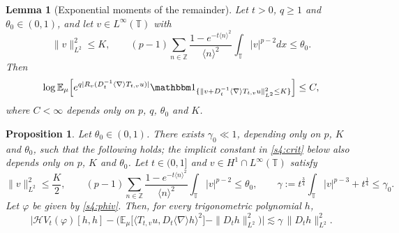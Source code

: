 \documentclass[10pt,a4paper]{amsart}
\theoremstyle{plain}
\newtheorem{lemma}[theorem]{Lemma}
\newtheorem{proposition}[theorem]{Proposition}
\theoremstyle{definition}
\theoremstyle{remark}
\newcommand{\Z}{\mathbb{Z}}
\newcommand{\T}{\mathbb{T}}
\renewcommand{\H}{\mathcal H}
\newcommand{\E}{\mathbb{E}}
\newcommand{\nb}{\nabla}
\newcommand{\les}{\lesssim}
\newcommand{\jb}[1]
{\langle #1 \rangle}
\newcommand{\ind}{\mathbbm 1}
\newcommand{\ph}{\varphi}
\begin{document}
\begin{lemma}[Exponential moments of the remainder]\label{s4:LEM:BD}
Let $t>0$, $q\ge1$ and $\theta_0\in(0,1)$, and let $v\in L^\infty(\T)$ with
\[
\|v\|_{L^2}^2\le K,\qquad (p-1)\sum_{n\in\Z}\frac{1-e^{-t\jb n^2}}{\jb n^2}\int_\T|v|^{p-2}dx\le\theta_0 .
\]
Then
\[
\log\E_\mu\Big[e^{q|R_v(D_t^{-1}\jb\nb T_{t,v}u)|}\ind_{\{\|v+D_t^{-1}\jb\nb T_{t,v}u\|_{L^2}^2\le K\}}\Big]\le C,
\]
where $C<\infty$ depends only on $p$, $q$, $\theta_0$ and $K$.
\end{lemma}

\begin{proposition}
\label{s4:PROP:crit}
Let $\theta_0\in(0,1)$. There exists $\gamma_0\ll1$,
depending only on $p$, $K$ and $\theta_0$, such that the following holds; the implicit constant in \eqref{s4:crit} below also depends only on $p$, $K$ and $\theta_0$. Let $t\in(0,1]$ and
$v\in H^1\cap L^\infty(\T)$ satisfy
\[
\|v\|_{L^2}^2\le\frac K2,\qquad (p-1)\sum_{n\in\Z}\frac{1-e^{-t\jb n^2}}{\jb n^2}\int_\T|v|^{p-2}\le\theta_0,
\qquad
\gamma:=t^{\frac34}\int_\T|v|^{p-3}+t^{\frac14}\le\gamma_0 .
\]
Let $\ph$ be given by \eqref{s4:phiv}. Then, for every trigonometric polynomial $h$,
\begin{equation}\label{s4:crit}
\Big|\H V_t(\ph)[h,h]-\Big(\E_\mu\big[\jb{T_{t,v}u,D_t\jb\nb h}^2\big]-\|D_th\|_{L^2}^2\Big)\Big|
\les \gamma\,\|D_th\|_{L^2}^2 .
\end{equation}
\end{proposition}
\end{document}
